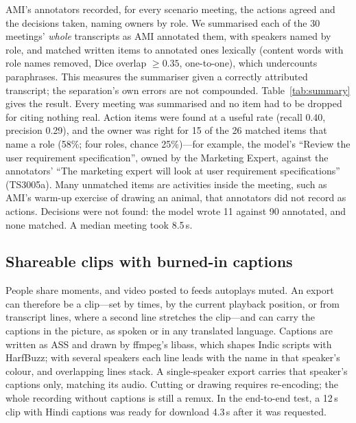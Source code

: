 \begin{table}[t]
\centering
\caption{Summaries of 30 AMI meetings from AMI's own speaker-attributed transcripts, against the action items and decisions AMI's annotators wrote. Lexical matching; a floor.}
\label{tab:summary}
\footnotesize
\setlength{\tabcolsep}{4pt}

\end{table}

AMI's annotators recorded, for every scenario meeting, the actions agreed and the decisions taken, naming owners by role. We summarised each of the 30 meetings' \emph{whole} transcripts as AMI annotated them, with speakers named by role, and matched written items to annotated ones lexically (content words with role names removed, Dice overlap $\ge 0.35$, one-to-one), which undercounts paraphrases. This measures the summariser given a correctly attributed transcript; the separation's own errors are not compounded. Table~\ref{tab:summary} gives the result. Every meeting was summarised and no item had to be dropped for citing nothing real. Action items were found at a useful rate (recall 0.40, precision 0.29), and the owner was right for 15 of the 26 matched items that name a role (58\%; four roles, chance 25\%)---for example, the model's ``Review the user requirement specification'', owned by the Marketing Expert, against the annotators' ``The marketing expert will look at user requirement specifications'' (TS3005a). Many unmatched items are activities inside the meeting, such as AMI's warm-up exercise of drawing an animal, that annotators did not record as actions. Decisions were not found: the model wrote 11 against 90 annotated, and none matched. A median meeting took 8.5\,s.

\subsection{Shareable clips with burned-in captions}
People share moments, and video posted to feeds autoplays muted. An export can therefore be a clip---set by times, by the current playback position, or from transcript lines, where a second line stretches the clip---and can carry the captions in the picture, as spoken or in any translated language. Captions are written as ASS and drawn by ffmpeg's libass, which shapes Indic scripts with HarfBuzz; with several speakers each line leads with the name in that speaker's colour, and overlapping lines stack. A single-speaker export carries that speaker's captions only, matching its audio. Cutting or drawing requires re-encoding; the whole recording without captions is still a remux. In the end-to-end test, a 12\,s clip with Hindi captions was ready for download 4.3\,s after it was requested.
